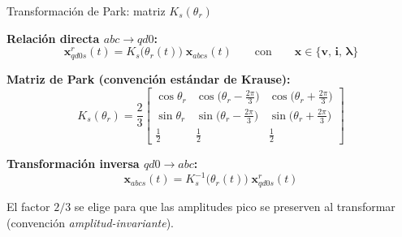 \documentclass[aspectratio=169,t]{beamer}
\begin{document}
\begin{frame}{Transformación de Park: matriz $K_s(\theta_r)$}
\vspace{3mm}

\textbf{Relación directa $abc \rightarrow qd0$:}
\begin{equation*}
\bm{x}^{r}_{qd0s}(t) = K_s\!\big(\theta_r(t)\big)\;\bm{x}_{abcs}(t)
\qquad\text{con}\qquad \bm{x}\in\{\bm{v},\,\bm{i},\,\bm{\lambda}\}
\end{equation*}

\textbf{Matriz de Park (convención estándar de Krause):}
\begin{equation*}
K_s(\theta_r) = \frac{2}{3}
\begin{bmatrix}
\cos\theta_r & \cos\!\big(\theta_r-\tfrac{2\pi}{3}\big) & \cos\!\big(\theta_r+\tfrac{2\pi}{3}\big) \\[4pt]
\sin\theta_r & \sin\!\big(\theta_r-\tfrac{2\pi}{3}\big) & \sin\!\big(\theta_r+\tfrac{2\pi}{3}\big) \\[4pt]
\tfrac{1}{2} & \tfrac{1}{2} & \tfrac{1}{2}
\end{bmatrix}
\end{equation*}

\textbf{Transformación inversa $qd0\rightarrow abc$:}
\begin{equation*}
\bm{x}_{abcs}(t) = K_s^{-1}\!\big(\theta_r(t)\big)\;\bm{x}^{r}_{qd0s}(t)
\end{equation*}

{\small El factor $2/3$ se elige para que las amplitudes pico se preserven al transformar (convención \emph{amplitud-invariante}).}
\end{frame}
\end{document}
